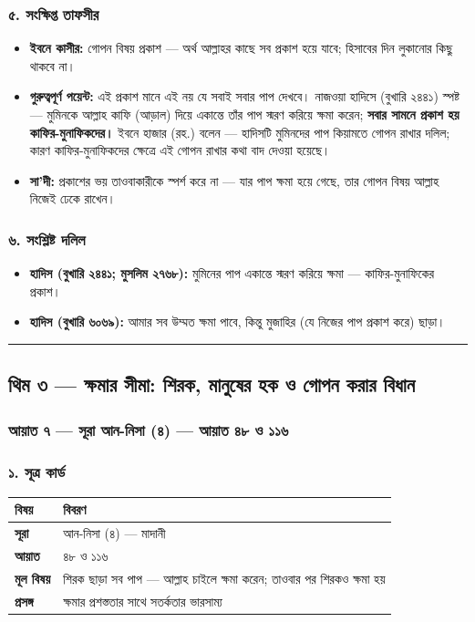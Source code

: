 \subsubsection*{৫. সংক্ষিপ্ত তাফসীর}

\begin{itemize}
\item \textbf{ইবনে কাসীর:} গোপন বিষয় প্রকাশ — অর্থ আল্লাহর কাছে সব প্রকাশ হয়ে যাবে; হিসাবের দিন লুকানোর কিছু থাকবে না।
\item \textbf{গুরুত্বপূর্ণ পয়েন্ট:} এই প্রকাশ মানে এই নয় যে সবাই সবার পাপ দেখবে। নাজওয়া হাদিসে (বুখারি ২৪৪১) স্পষ্ট — মুমিনকে আল্লাহ কাফি (আড়াল) দিয়ে একান্তে তাঁর পাপ স্মরণ করিয়ে ক্ষমা করেন; \textbf{সবার সামনে প্রকাশ হয় কাফির-মুনাফিকদের।} ইবনে হাজার (রহ.) বলেন — হাদিসটি মুমিনদের পাপ কিয়ামতে গোপন রাখার দলিল; কারণ কাফির-মুনাফিকদের ক্ষেত্রে এই গোপন রাখার কথা বাদ দেওয়া হয়েছে।
\item \textbf{সা'দী:} প্রকাশের ভয় তাওবাকারীকে স্পর্শ করে না — যার পাপ ক্ষমা হয়ে গেছে, তার গোপন বিষয় আল্লাহ নিজেই ঢেকে রাখেন।
\end{itemize}
\subsubsection*{৬. সংশ্লিষ্ট দলিল}

\begin{itemize}
\item \textbf{হাদিস (বুখারি ২৪৪১; মুসলিম ২৭৬৮):} মুমিনের পাপ একান্তে স্মরণ করিয়ে ক্ষমা — কাফির-মুনাফিকের প্রকাশ।
\item \textbf{হাদিস (বুখারি ৬০৬৯):} আমার সব উম্মত ক্ষমা পাবে, কিন্তু মুজাহির (যে নিজের পাপ প্রকাশ করে) ছাড়া।
\end{itemize}
\medskip\hrule\medskip

\subsection*{থিম ৩ — ক্ষমার সীমা: শিরক, মানুষের হক ও গোপন করার বিধান}

\subsubsection*{আয়াত ৭ — সূরা আন-নিসা (৪) — আয়াত ৪৮ ও ১১৬}

\subsubsection*{১. সূত্র কার্ড}

\begin{table}[h]\centering\small
\begin{tabular}{ll}
বিষয় & বিবরণ \\
\hline
\textbf{সূরা} & আন-নিসা (৪) — মাদানী \\
\textbf{আয়াত} & ৪৮ ও ১১৬ \\
\textbf{মূল বিষয়} & শিরক ছাড়া সব পাপ — আল্লাহ চাইলে ক্ষমা করেন; তাওবার পর শিরকও ক্ষমা হয় \\
\textbf{প্রসঙ্গ} & ক্ষমার প্রশস্ততার সাথে সতর্কতার ভারসাম্য \\
\hline
\end{tabular}
\end{table}

